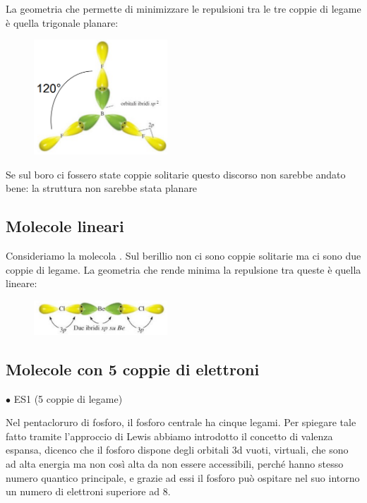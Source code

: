 La geometria che permette di minimizzare le repulsioni tra le tre coppie di legame è quella trigonale planare:
\begin{figure}[htp]
    \centering
    \includegraphics[width=5cm]{immagini/BF_3.png}
\end{figure}
Se sul boro ci fossero state coppie solitarie questo discorso non sarebbe andato bene: la struttura non sarebbe stata planare
\subsection{Molecole lineari}
Consideriamo la molecola . Sul berillio non ci sono coppie solitarie ma ci sono due coppie di legame. La geometria che rende minima la repulsione tra queste è quella lineare:
\begin{figure}[htp]
    \centering
    \includegraphics[width=5cm]{immagini/BeCl_2.png}
\end{figure}
\subsection{Molecole con 5 coppie di elettroni}
$\bullet$ ES1  (5 coppie di legame)

Nel pentacloruro di fosforo, il fosforo centrale ha cinque legami. Per spiegare tale fatto tramite l'approccio di Lewis abbiamo introdotto il concetto di valenza espansa, dicenco che il fosforo dispone degli orbitali 3d vuoti, virtuali, che sono ad alta energia ma non così alta da non essere accessibili, perché hanno stesso numero quantico principale, e grazie ad essi il fosforo può ospitare nel suo intorno un numero di elettroni superiore ad 8.

